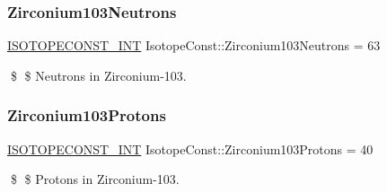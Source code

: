 \subsubsection{\texorpdfstring{Zirconium103\+Neutrons}{Zirconium103Neutrons}}
{\footnotesize\ttfamily \mbox{\hyperlink{group___isotope_const-_macros_ga5f18360b3e99483a35c32d789e62621c}{I\+S\+O\+T\+O\+P\+E\+C\+O\+N\+S\+T\+\_\+\+I\+NT}} Isotope\+Const\+::\+Zirconium103\+Neutrons = 63}

\$ \$ Neutrons in Zirconium-\/103. \mbox{\label{group___isotope_const-_zirconium-_zr103_gab8601dfc63d83d7c7dc45fa18e1f9668}} 
\subsubsection{\texorpdfstring{Zirconium103\+Protons}{Zirconium103Protons}}
{\footnotesize\ttfamily \mbox{\hyperlink{group___isotope_const-_macros_ga5f18360b3e99483a35c32d789e62621c}{I\+S\+O\+T\+O\+P\+E\+C\+O\+N\+S\+T\+\_\+\+I\+NT}} Isotope\+Const\+::\+Zirconium103\+Protons = 40}

\$ \$ Protons in Zirconium-\/103. 